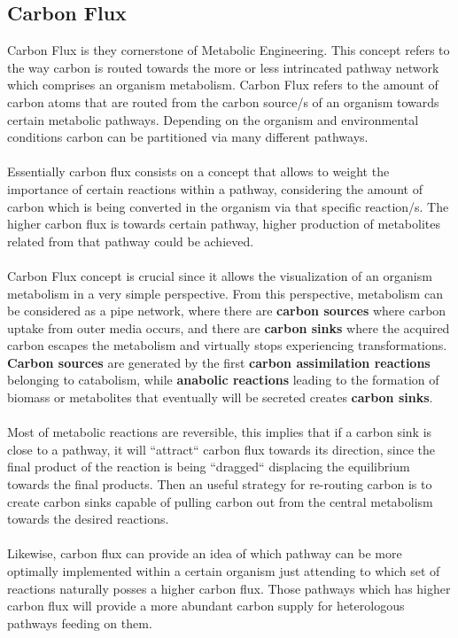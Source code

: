 \subsection{Carbon Flux}
Carbon Flux is they cornerstone of Metabolic Engineering. This concept refers to the way carbon is routed towards the more or less intrincated pathway network which comprises an organism metabolism. Carbon Flux refers to the amount of carbon atoms that are routed from the carbon source/s of an organism towards certain metabolic pathways. Depending on the organism and environmental conditions carbon can be partitioned via many different pathways. \\ \\
Essentially carbon flux consists on a concept that allows to weight the importance of certain reactions within a pathway, considering the amount of carbon which is being converted in the organism via that specific reaction/s.  The higher carbon flux is towards certain pathway, higher production of metabolites related from that pathway could be achieved. \\ \\
Carbon Flux concept is crucial since it allows the visualization of an organism metabolism in a very simple perspective. From this perspective, metabolism can be considered as a pipe network, where there are \textbf{carbon sources} where carbon uptake from outer media occurs, and there are \textbf{carbon sinks} where the acquired carbon escapes the metabolism and virtually stops experiencing transformations. \textbf{Carbon sources} are generated by the first \textbf{carbon assimilation reactions} belonging to catabolism, while \textbf{anabolic reactions} leading to the formation of biomass or metabolites that eventually will be secreted creates \textbf{carbon sinks}. \\ \\
Most of metabolic reactions are reversible, this implies that if a carbon sink is close to a pathway, it will “attract“ carbon flux towards its direction, since the final product of the reaction is being “dragged“ displacing the equilibrium towards the final products. Then an useful strategy for re-routing carbon is to create carbon sinks capable of pulling carbon out from the central metabolism towards the desired reactions. \\ \\
Likewise, carbon flux can provide an idea of which pathway can be more optimally implemented within a certain organism just attending to which set of reactions naturally posses a higher carbon flux. Those pathways which has higher carbon flux will provide a more abundant carbon supply for heterologous pathways feeding on them.
